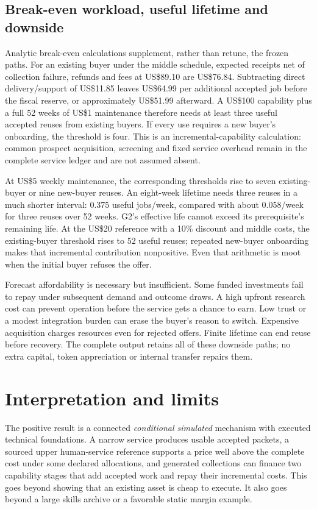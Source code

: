 \documentclass[11pt,letterpaper]{article}
\newcommand{\usd}[1]{US\$#1}
\begin{document}
\subsection{Break-even workload, useful lifetime and downside}
Analytic break-even calculations supplement, rather than retune, the frozen paths. For an existing buyer under the middle schedule, expected receipts net of collection failure, refunds and fees at \usd{89.10} are \usd{76.84}. Subtracting direct delivery/support of \usd{11.85} leaves \usd{64.99} per additional accepted job before the fiscal reserve, or approximately \usd{51.99} afterward. A \usd{100} capability plus a full 52 weeks of \usd{1} maintenance therefore needs at least three useful accepted reuses from existing buyers. If every use requires a new buyer's onboarding, the threshold is four. This is an incremental-capability calculation: common prospect acquisition, screening and fixed service overhead remain in the complete service ledger and are not assumed absent.

At \usd{5} weekly maintenance, the corresponding thresholds rise to seven existing-buyer or nine new-buyer reuses. An eight-week lifetime needs three reuses in a much shorter interval: 0.375 useful jobs/week, compared with about 0.058/week for three reuses over 52 weeks. G2's effective life cannot exceed its prerequisite's remaining life. At the \usd{20} reference with a 10\% discount and middle costs, the existing-buyer threshold rises to 52 useful reuses; repeated new-buyer onboarding makes that incremental contribution nonpositive. Even that arithmetic is moot when the initial buyer refuses the offer.

Forecast affordability is necessary but insufficient. Some funded investments fail to repay under subsequent demand and outcome draws. A high upfront research cost can prevent operation before the service gets a chance to earn. Low trust or a modest integration burden can erase the buyer's reason to switch. Expensive acquisition charges resources even for rejected offers. Finite lifetime can end reuse before recovery. The complete output retains all of these downside paths; no extra capital, token appreciation or internal transfer repairs them.

\section{Interpretation and limits}
The positive result is a connected \emph{conditional simulated} mechanism with executed technical foundations. A narrow service produces usable accepted packets, a sourced upper human-service reference supports a price well above the complete cost under some declared allocations, and generated collections can finance two capability stages that add accepted work and repay their incremental costs. This goes beyond showing that an existing asset is cheap to execute. It also goes beyond a large skills archive or a favorable static margin example.
\end{document}
